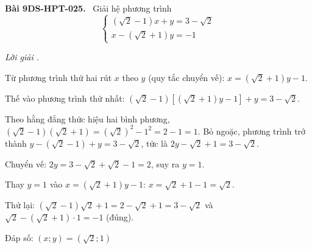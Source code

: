 \documentclass[12pt,a4paper]{article}
\newenvironment{problem}[1][]{\par\medskip\noindent\textbf{Bài #1.}\ }{\par}
\newenvironment{solution}[1][]{\par\noindent\textit{Lời giải #1.}\par}{\par}
\begin{document}
\begin{problem}[9DS-HPT-025]
Giải hệ phương trình
\[ \begin{cases} (\sqrt{2} - 1)x + y = 3 - \sqrt{2} \\ x - (\sqrt{2} + 1)y = -1 \end{cases} \]

\begin{solution}
Từ phương trình thứ hai rút $x$ theo $y$ (quy tắc chuyển vế): $x = (\sqrt{2} + 1)y - 1$.

Thế vào phương trình thứ nhất: $(\sqrt{2} - 1)\left[(\sqrt{2} + 1)y - 1\right] + y = 3 - \sqrt{2}$.

Theo hằng đẳng thức hiệu hai bình phương, $(\sqrt{2} - 1)(\sqrt{2} + 1) = (\sqrt{2})^2 - 1^2 = 2 - 1 = 1$. Bỏ ngoặc, phương trình trở thành $y - (\sqrt{2} - 1) + y = 3 - \sqrt{2}$, tức là $2y - \sqrt{2} + 1 = 3 - \sqrt{2}$.

Chuyển vế: $2y = 3 - \sqrt{2} + \sqrt{2} - 1 = 2$, suy ra $y = 1$.

Thay $y = 1$ vào $x = (\sqrt{2} + 1)y - 1$: $x = \sqrt{2} + 1 - 1 = \sqrt{2}$.

Thử lại: $(\sqrt{2} - 1)\sqrt{2} + 1 = 2 - \sqrt{2} + 1 = 3 - \sqrt{2}$ và $\sqrt{2} - (\sqrt{2} + 1) \cdot 1 = -1$ (đúng).

Đáp số: $\boxed{(x; y) = (\sqrt{2}; 1)}$
\end{solution}
\end{problem}
\end{document}
